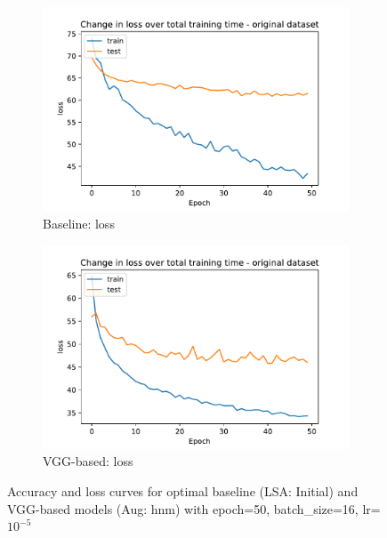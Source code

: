 \begin{figure}[!htb]
\begin{subfigure}[b]{0.5\linewidth}
         \centering
          \includegraphics[scale=0.5]{Figs/chap4/denoised_e50_b16_loss.pdf}
          \caption{Baseline: loss}
     \end{subfigure}
     \begin{subfigure}[b]{0.5\linewidth}
         \centering
          \includegraphics[scale=0.5]{Figs/chap4/vgg_augment_denoise_e50_b16_loss.pdf}
          \caption{VGG-based: loss}
     \end{subfigure}
  \caption{Accuracy and loss curves for optimal baseline (LSA: Initial) and VGG-based models (Aug: hnm) with epoch=50, batch\_size=16, lr=$10^{-5}$}
  \label{Fig:curve}
\end{figure}
